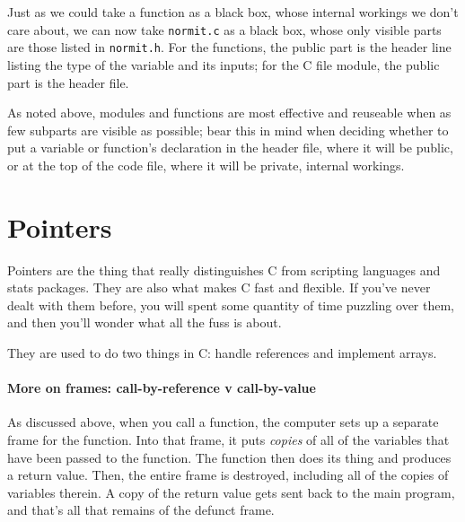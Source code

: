 \documentclass[12pt]{article}
\def\ind#1{\index{#1}#1}
\begin{document}
Just as we could take a function as a black box, whose internal workings
we don't care about, we can now take {\tt normit.c} as a black box,
whose only visible parts are those listed in {\tt normit.h}. For the functions, the public part is the
header line listing the type of the variable and its inputs; for the C file module, the public part is
the header file. 

As noted above, modules and functions are most effective and  reuseable when as few
subparts are visible as possible; bear this in mind when deciding whether to put a variable or
function's declaration in the header file, where it will be public, or at the top of the code file,
where it will be private, internal workings.

 \label{prepointers}\section{Pointers} \label{pointers} 

Pointers are the thing that really distinguishes C from scripting
languages and stats packages. They are also what makes C fast and
flexible. If you've never dealt with them before, you will spent some
quantity of time puzzling over them, and then you'll wonder what all the
fuss is about. 

They are used to do two things in C: handle references and implement arrays.

\paragraph{More on \ind{frames}: \ind{call-by-reference} v \ind{call-by-value}}

As discussed above,
when you call a function, the computer sets up a separate frame
for the function. Into that frame, it puts {\it copies} of all of the
variables that have been passed to the function. The function then does its
thing and produces a return value. Then, the entire frame is destroyed,
including all of the copies of variables therein. A copy of the return value gets
sent back to the main program, and that's all that remains of the defunct
frame. 
\end{document}
